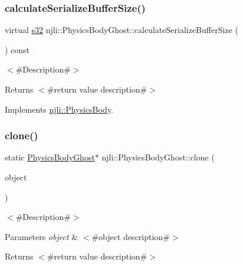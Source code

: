 \subsubsection{\texorpdfstring{calculate\+Serialize\+Buffer\+Size()}{calculateSerializeBufferSize()}}
{\footnotesize\ttfamily virtual \mbox{\hyperlink{_util_8h_aa62c75d314a0d1f37f79c4b73b2292e2}{s32}} njli\+::\+Physics\+Body\+Ghost\+::calculate\+Serialize\+Buffer\+Size (\begin{DoxyParamCaption}{ }\end{DoxyParamCaption}) const\hspace{0.3cm}{\ttfamily [virtual]}}

$<$\#\+Description\#$>$

\begin{DoxyReturn}{Returns}
$<$\#return value description\#$>$ 
\end{DoxyReturn}


Implements \mbox{\hyperlink{classnjli_1_1_physics_body_a21bdbc459532f004dc4cd0e9c99a4765}{njli\+::\+Physics\+Body}}.

\mbox{\label{classnjli_1_1_physics_body_ghost_a064764d7ba64bf280729bdb0c6d17743}} 
\subsubsection{\texorpdfstring{clone()}{clone()}}
{\footnotesize\ttfamily static \mbox{\hyperlink{classnjli_1_1_physics_body_ghost}{Physics\+Body\+Ghost}}$\ast$ njli\+::\+Physics\+Body\+Ghost\+::clone (\begin{DoxyParamCaption}\item[{const \mbox{\hyperlink{classnjli_1_1_physics_body_ghost}{Physics\+Body\+Ghost}} \&}]{object }\end{DoxyParamCaption})\hspace{0.3cm}{\ttfamily [static]}}

$<$\#\+Description\#$>$


\begin{DoxyParams}{Parameters}
{\em object} & $<$\#object description\#$>$\\
\hline
\end{DoxyParams}
\begin{DoxyReturn}{Returns}
$<$\#return value description\#$>$ 
\end{DoxyReturn}
\mbox{\label{classnjli_1_1_physics_body_ghost_ab50b73dd844cd6d9aa1304df0367da16}} 
